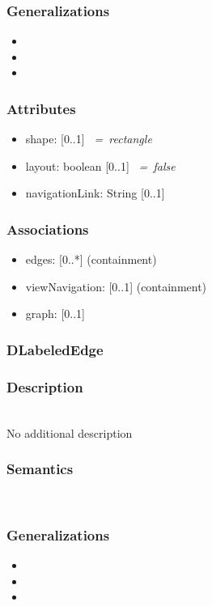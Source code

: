 \documentclass{article}
\begin{document}
\subsubsection*{Generalizations}
\begin{itemize}
\item {}
\item {}
\item {}
\end{itemize}
\subsubsection*{Attributes}
\begin{itemize}
\item shape:  [0..1]  \textit{~=~rectangle} 
\item layout: boolean [0..1]  \textit{~=~false} 
\item navigationLink: String [0..1] 
\end{itemize}
\subsubsection*{Associations}
\begin{itemize}
\item edges:  [0..*] (containment) 
\item viewNavigation:  [0..1] (containment) 
\item graph:  [0..1] 
\end{itemize}
\subsubsection{DLabeledEdge}\label{DLabeledEdge} 
\subsubsection*{Description} ~\\ No additional description
\subsubsection*{Semantics} ~\\

\subsubsection*{Generalizations}
\begin{itemize}
\item {}
\item {}
\item {}
\end{itemize}
\end{document}
